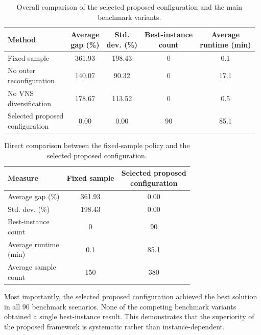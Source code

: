 \begin{table}[H]
\centering
\caption{Overall comparison of the selected proposed configuration and the main benchmark variants.}
\label{tab:main_benchmark_comparison}
\begin{tabular}{lcccc}
\hline
\textbf{Method}
& \shortstack{\textbf{Average}\\\textbf{gap (\%)}}
& \shortstack{\textbf{Std.}\\\textbf{dev. (\%)}}
& \shortstack{\textbf{Best-instance}\\\textbf{count}}
& \shortstack{\textbf{Average}\\\textbf{runtime (min)}} \\
\hline
Fixed sample & 361.93 & 198.43 & 0 & 0.1 \\
\shortstack[l]{No outer\\reconfiguration} & 140.07 & 90.32 & 0 & 17.1 \\
\shortstack[l]{No VNS\\diversification} & 178.67 & 113.52 & 0 & 0.5 \\
\shortstack[l]{Selected proposed\\configuration} & 0.00 & 0.00 & 90 & 85.1 \\
\hline
\end{tabular}
\end{table}

\begin{table}[H]
\centering
\caption{Direct comparison between the fixed-sample policy and the selected proposed configuration.}
\label{tab:fixed_selected_sample_comparison}
\begin{tabular}{lcc}
\hline
\textbf{Measure}
& \textbf{Fixed sample}
& \shortstack{\textbf{Selected proposed}\\\textbf{configuration}} \\
\hline
Average gap (\%) & 361.93 & 0.00 \\
Std. dev. (\%) & 198.43 & 0.00 \\
\shortstack[l]{Best-instance\\count} & 0 & 90 \\
\shortstack[l]{Average runtime\\(min)} & 0.1 & 85.1 \\
\shortstack[l]{Average sample\\count} & 150 & 380 \\
\hline
\end{tabular}
\end{table}

Most importantly, the selected proposed configuration achieved the best solution in all \(90\) benchmark scenarios. None of the competing benchmark variants obtained a single best-instance result. This demonstrates that the superiority of the proposed framework is systematic rather than instance-dependent.

